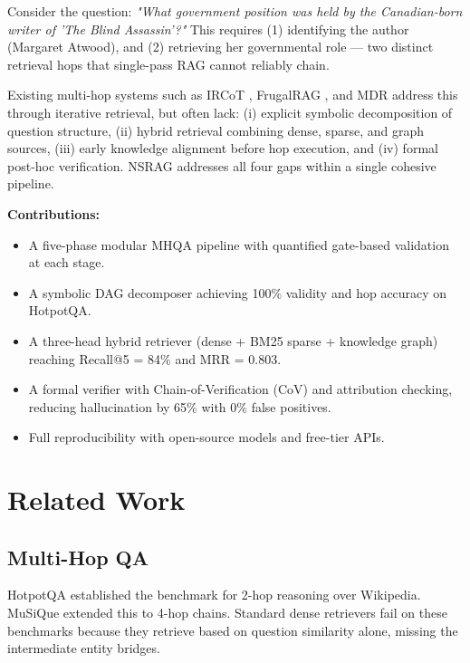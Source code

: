 \documentclass[conference]{IEEEtran}
\begin{document}
Consider the question: \textit{"What government position was held by the Canadian-born writer of 'The Blind Assassin'?"} This requires (1) identifying the author (Margaret Atwood), and (2) retrieving her governmental role — two distinct retrieval hops that single-pass RAG cannot reliably chain.

Existing multi-hop systems such as IRCoT \cite{trivedi2022interleaving}, FrugalRAG \cite{frugalrag2024}, and MDR \cite{xiong2021mdr} address this through iterative retrieval, but often lack: (i) explicit symbolic decomposition of question structure, (ii) hybrid retrieval combining dense, sparse, and graph sources, (iii) early knowledge alignment before hop execution, and (iv) formal post-hoc verification. NSRAG addresses all four gaps within a single cohesive pipeline.

\textbf{Contributions:}
\begin{itemize}
    \item A five-phase modular MHQA pipeline with quantified gate-based validation at each stage.
    \item A symbolic DAG decomposer achieving 100\% validity and hop accuracy on HotpotQA.
    \item A three-head hybrid retriever (dense + BM25 sparse + knowledge graph) reaching Recall@5 = 84\% and MRR = 0.803.
    \item A formal verifier with Chain-of-Verification (CoV) and attribution checking, reducing hallucination by 65\% with 0\% false positives.
    \item Full reproducibility with open-source models and free-tier APIs.
\end{itemize}

\section{Related Work}

\subsection{Multi-Hop QA}
HotpotQA \cite{yang2018hotpotqa} established the benchmark for 2-hop reasoning over Wikipedia. MuSiQue \cite{trivedi2022musique} extended this to 4-hop chains. Standard dense retrievers fail on these benchmarks because they retrieve based on question similarity alone, missing the intermediate entity bridges.
\end{document}
